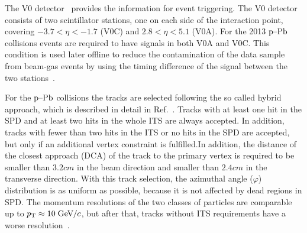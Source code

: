 The V0 detector~\cite{forwarddetectorsTdr} provides the information for event triggering. The V0 detector consists of two scintillator stations, one on each side of the interaction point, covering $-3.7 < \eta < -1.7$ (V0C) and $2.8 < \eta < 5.1$ (V0A). %
For the 2013 $\mbox{p--Pb}$ collisions events are required to have signals in both V0A and V0C. This condition is used later offline to reduce the contamination of the data sample from beam-gas events by using the timing difference of the signal between the two stations~\cite{alicePerformance}.


For the $\mbox{p--Pb}$ collisions the tracks are selected following the so called hybrid approach, which is described in detail in Ref.~\cite{hybridExplanation}. Tracks with at least one hit in the SPD and at least two hits in the whole ITS are always accepted. In addition, tracks with fewer than two hits in the ITS or no hits in the SPD are accepted, but only if an additional vertex constraint is fulfilled.In addition, the distance of the closest approach (DCA) of the track to the primary vertex is required to be smaller than $\unit{3.2}{cm}$ in the beam direction and smaller than $\unit{2.4}{cm}$ in the transverse direction. With this track selection, the azimuthal angle ($\varphi$) distribution is as uniform as possible, because it is not affected by dead regions in SPD. The momentum resolutions of the two classes of particles are comparable up to $p_{\rm T} \approx 10\;\mathrm{GeV}\kern-0.05em/\kern-0.02em c$, but after that, tracks without ITS requirements have a worse resolution~\cite{alicePerformance,aliceBackgroundFluctuation}.

